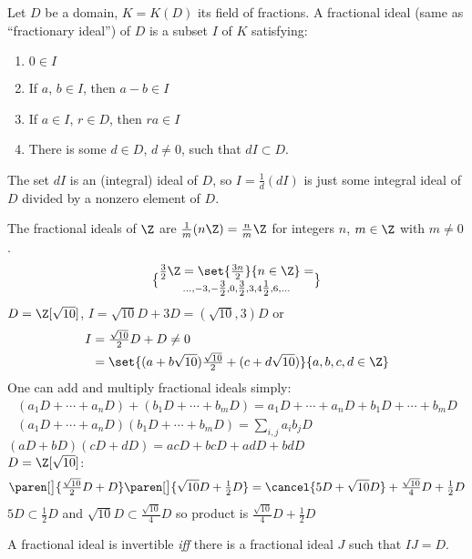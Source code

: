  Let $D$ be a domain, $K=K(D)$ its field of fractions.  A fractional ideal (same as ``fractionary ideal'') of $D$ is a subset $I$ of $K$ satisfying:
\begin{enumerate}[label=(\arabic*)]
\item $0\in I$
\item If $a$, $b\in I$, then $a-b\in I$
\item If $a\in I$, $r\in D$, then $ra\in I$
\item There is some $d\in D$, $d\neq0$, such that $dI\subset D$.
\end{enumerate}
\note The set $dI$ is an (integral) ideal of $D$, so $I=\frac1d(dI)$ is just some integral ideal of $D$ divided by a nonzero element of $D$.

\eg The fractional ideals of $\Z$ are $\frac1m(n\Z)=\frac nm\Z$ for integers $n$, $m\in\Z$ with $m\neq0$.
\[ \tfrac32\Z = \set{\tfrac{3n}{2}}{n\in\Z} = \brace{\dotsc,-3,-\tfrac32,0,\tfrac32,3,4\tfrac12,6,\dotsc} \]
\eg $D=\Z[\sqrt{10}]$, $I=\sqrt{10}D+3D=(\sqrt{10},3)D$ or
\begin{align*}
I &= \tfrac{\sqrt{10}}{2}D + D \neq 0 \\
&= \set{(a+b\sqrt{10})\tfrac{\sqrt{10}}{2}+(c+d\sqrt{10})}{a,b,c,d\in\Z}
\end{align*}
One can add and multiply fractional ideals simply:
\begin{gather*}
(a_1 D + \dotsb + a_n D) + (b_1 D + \dotsb + b_m D) = a_1 D + \dotsb + a_n D + b_1 D + \dotsb + b_m D \\
(a_1 D + \dotsb + a_n D)(b_1 D + \dotsb + b_m D) = \sum_{i,j} a_i b_j D
\end{gather*}%
\eg
$(aD+bD)(cD+dD) = acD + bcD + adD + bdD$ \\
\eg $D=\Z[\sqrt{10}]$:
\[ \paren[\big]{\tfrac{\sqrt{10}}{2}D+D}\paren[\big]{\sqrt{10}D+\tfrac12D} = \cancel{5D+\sqrt{10}D} + \tfrac{\sqrt{10}}{4}D + \tfrac12D \]
$5D\subset\tfrac12D$ and $\sqrt{10}D\subset\tfrac{\sqrt{10}}{4}D$ so product is $\tfrac{\sqrt{10}}{4}D+\tfrac12D$

 A fractional ideal is invertible \emph{iff} there is a fractional ideal $J$ such that $IJ=D$.

